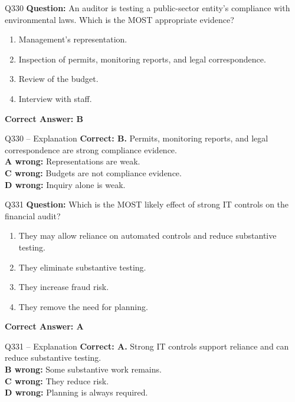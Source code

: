 \documentclass[aspectratio=169,10pt]{beamer}
\begin{document}
	\begin{frame}[t]{Q330}
		\small
		\textbf{Question:} An auditor is testing a public-sector entity's compliance with environmental laws. Which is the MOST appropriate evidence?
		\begin{enumerate}[label=\Alph*.,itemsep=1pt,topsep=2pt]
			\item Management's representation.
			\item Inspection of permits, monitoring reports, and legal correspondence.
			\item Review of the budget.
			\item Interview with staff.
		\end{enumerate}
		\vspace{4pt}
		\textbf{Correct Answer: B}
	\end{frame}
	
	\begin{frame}[t]{Q330 -- Explanation}
		\small
		\textbf{Correct: B.} Permits, monitoring reports, and legal correspondence are strong compliance evidence. \\[4pt]
		\textbf{A wrong:} Representations are weak. \\[2pt]
		\textbf{C wrong:} Budgets are not compliance evidence. \\[2pt]
		\textbf{D wrong:} Inquiry alone is weak.
	\end{frame}
	
	\begin{frame}[t]{Q331}
		\small
		\textbf{Question:} Which is the MOST likely effect of strong IT controls on the financial audit?
		\begin{enumerate}[label=\Alph*.,itemsep=1pt,topsep=2pt]
			\item They may allow reliance on automated controls and reduce substantive testing.
			\item They eliminate substantive testing.
			\item They increase fraud risk.
			\item They remove the need for planning.
		\end{enumerate}
		\vspace{4pt}
		\textbf{Correct Answer: A}
	\end{frame}
	
	\begin{frame}[t]{Q331 -- Explanation}
		\small
		\textbf{Correct: A.} Strong IT controls support reliance and can reduce substantive testing. \\[4pt]
		\textbf{B wrong:} Some substantive work remains. \\[2pt]
		\textbf{C wrong:} They reduce risk. \\[2pt]
		\textbf{D wrong:} Planning is always required.
	\end{frame}
	
\end{document}
